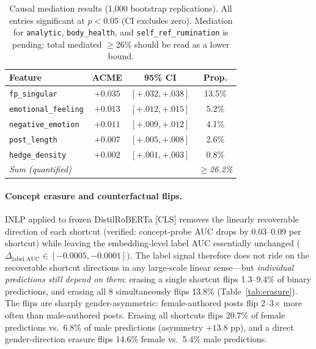 \documentclass[11pt]{article}
\begin{document}
\begin{table}[t]
\centering
\small
\caption{Causal mediation results (1{,}000 bootstrap replications). All entries significant at $p < 0.05$ (CI excludes zero). Mediation for \texttt{analytic}, \texttt{body\_health}, and \texttt{self\_ref\_rumination} is pending; total mediated $\geq$26\% should be read as a lower bound.}
\label{tab:mediation}
\begin{tabular}{lccc}
\toprule
\textbf{Feature} & \textbf{ACME} & \textbf{95\% CI} & \textbf{Prop.} \\
\midrule
\texttt{fp\_singular}       & $+0.035$ & {$[+.032, +.038]$} & 13.5\% \\
\texttt{emotional\_feeling} & $+0.013$ & {$[+.012, +.015]$} &  5.2\% \\
\texttt{negative\_emotion}  & $+0.011$ & {$[+.009, +.012]$} &  4.1\% \\
\texttt{post\_length}       & $+0.007$ & {$[+.005, +.008]$} &  2.6\% \\
\texttt{hedge\_density}     & $+0.002$ & {$[+.001, +.003]$} &  0.8\% \\
\midrule
\textit{Sum (quantified)}   &          &                   & \textit{$\geq$26.2\%} \\
\bottomrule
\end{tabular}
\end{table}

\paragraph{Concept erasure and counterfactual flips.}
INLP applied to frozen DistilRoBERTa [CLS] removes the linearly recoverable direction of each shortcut (verified: concept-probe AUC drops by 0.03--0.09 per shortcut) while leaving the embedding-level label AUC essentially unchanged ($\Delta_{\text{label AUC}} \in [-0.0005, -0.0001]$). The label signal therefore does not ride on the recoverable shortcut directions in any large-scale linear sense---but \emph{individual predictions still depend on them}: erasing a single shortcut flips 1.3--9.4\% of binary predictions, and erasing all 8 simultaneously flips 13.8\% (Table~\ref{tab:erasure}). The flips are sharply gender-asymmetric: female-authored posts flip 2--3$\times$ more often than male-authored posts. Erasing all shortcuts flips 20.7\% of female predictions vs.\ 6.8\% of male predictions (asymmetry $+13.8$ pp), and a direct gender-direction erasure flips 14.6\% female vs.\ 5.4\% male predictions.
\end{document}
